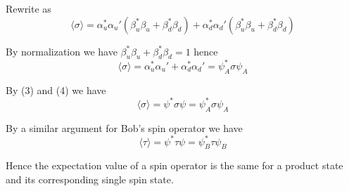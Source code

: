 \documentclass[12pt]{article}
\begin{document}
Rewrite as
\begin{equation*}
\langle\sigma\rangle=\alpha_u^*\alpha_u'(\beta_u^*\beta_u+\beta_d^*\beta_d)
+\alpha_d^*\alpha_d'(\beta_u^*\beta_u+\beta_d^*\beta_d)
\end{equation*}

By normalization we have $\beta_u^*\beta_u+\beta_d^*\beta_d=1$ hence
\begin{equation*}
\langle\sigma\rangle=\alpha_u^*\alpha_u'+\alpha_d^*\alpha_d'=\psi_A^*\sigma\psi_A
\tag{4}
\end{equation*}

By (3) and (4) we have
\begin{equation*}
\langle\sigma\rangle=\psi^*\sigma\psi=\psi_A^*\sigma\psi_A
\end{equation*}

By a similar argument for Bob's spin operator we have
\begin{equation*}
\langle\tau\rangle=\psi^*\tau\psi=\psi_B^*\tau\psi_B
\end{equation*}

Hence the expectation value of a spin operator is the same for a product state and its
corresponding single spin state.
\end{document}
